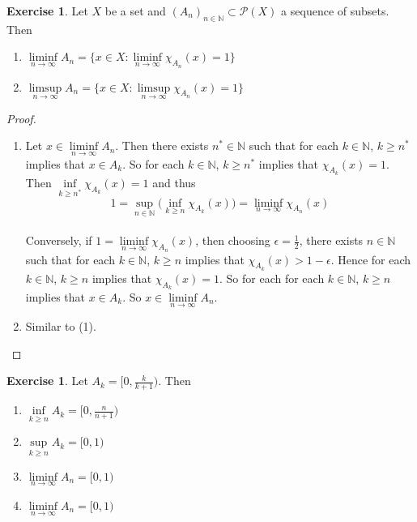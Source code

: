 \documentclass[12pt]{amsart}
\theoremstyle{definition}
\newtheorem{ex}[definition]{Exercise}
\newcommand{\ep}{\epsilon}
\newcommand{\N}{\mathbb{N}}
\newcommand{\MP}{\mathcal{P}}
\begin{document}
	\begin{ex}
		Let $X$ be a set and $(A_n)_{n \in \N} \subset \MP(X)$ a sequence of subsets. Then 
		\begin{enumerate}
			\item $\liminf\limits_{n \rightarrow \infty}A_n = \bigg \{x \in X: \liminf\limits_{n \rightarrow \infty}\chi_{A_n}(x) = 1\bigg\}$
			\item $\limsup\limits_{n \rightarrow \infty}A_n = \bigg \{x \in X: \limsup\limits_{n \rightarrow \infty}\chi_{A_n}(x) = 1\bigg\}$
		\end{enumerate}
	\end{ex}
	
	\begin{proof}\
		\begin{enumerate}
			\item Let $x \in \liminf\limits_{n \rightarrow \infty}A_n$. Then there exists $n^* \in \N$ such that for each $k \in \N$, $k \geq n^*$ implies that $x \in A_k$. So for each $k \in \N$, $k \geq n^*$ implies that $\chi_{A_k}(x) = 1$. Then $\inf\limits_{k \geq n^*}\chi_{A_k}(x) = 1$ and thus $$1 = \sup\limits_{n \in \N} \bigg(\inf\limits_{k \geq n} \chi_{A_k}(x) \bigg) = \liminf_{n \rightarrow \infty}\chi_{A_n}(x)$$ \vspace{3mm} \\
			Conversely, if $1 = \liminf\limits_{n \rightarrow \infty}\chi_{A_n}(x)$, then choosing $\ep = \frac{1}{2}$, there exists $n \in \N$ such that for each $k \in \N$, $k \geq n$ implies that $\chi_{A_k}(x) > 1-\ep$. Hence for each $k \in \N$, $k \geq n$ implies that $\chi_{A_k}(x) = 1$. So for each for each $k \in \N$, $k \geq n$ implies that $x \in A_k$. So $x \in \liminf\limits_{n \rightarrow \infty} A_n$. 
			\item Similar to (1).
		\end{enumerate}
	\end{proof}
	
	\begin{ex}
		Let $A_k = [0, \frac{k}{k+1})$. Then 
		\begin{enumerate}
			\item $\inf\limits_{k \geq n}A_k = [0, \frac{n}{n+1})$ \\
			\item $\sup\limits_{k \geq n}A_k = [0,1)$ \\
			\item $\liminf\limits_{n \rightarrow \infty}A_n = [0,1)$ \\
			\item $\liminf\limits_{n \rightarrow \infty}A_n = [0,1)$
		\end{enumerate}
	\end{ex}
	
\end{document}
